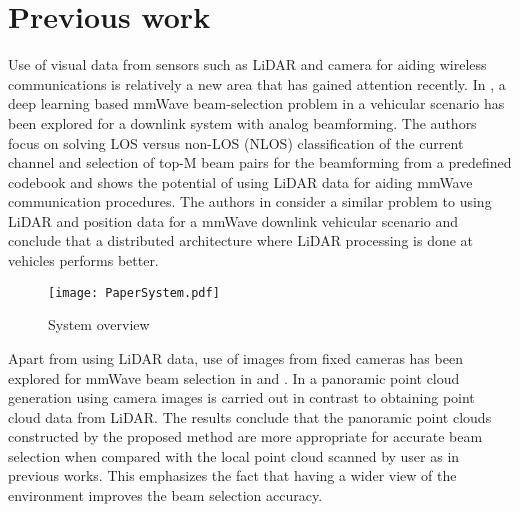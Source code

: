 \documentclass[conference]{IEEEtran}
\begin{document}




\section{Previous work}

Use of visual data from sensors such as LiDAR and camera  for aiding wireless communications is relatively a new area that has gained attention recently. In \cite{Aldebaro}, a deep learning based mmWave beam-selection problem in a vehicular  scenario has been explored for a downlink system with analog beamforming. The authors focus on solving LOS versus non-LOS (NLOS) classification of the current channel and selection of top-M beam pairs for the beamforming from a predefined codebook and shows the potential of using LiDAR data for aiding mmWave communication procedures. The authors in \cite{Dias} consider a similar problem to \cite{Aldebaro} using LiDAR and position data for a mmWave downlink vehicular scenario and conclude that a distributed architecture  where LiDAR processing is done at vehicles performs better.

\begin{figure*}
    \centering
    \texttt{[image: PaperSystem.pdf]}
    \caption{System overview}
    \label{fig:system}
\end{figure*}


Apart from using LiDAR data, use of images from fixed cameras has been explored for mmWave beam selection in \cite{Xu} and \cite{charan2020visionaided}. In \cite{Xu} a panoramic point cloud generation using camera images is carried out in contrast to obtaining point cloud data from LiDAR. The results conclude that the panoramic point clouds constructed by the proposed method are more appropriate for accurate beam selection when compared with the local point cloud scanned by user as in previous works. This emphasizes the fact that having a wider view of the environment improves the beam selection accuracy. 
\end{document}
